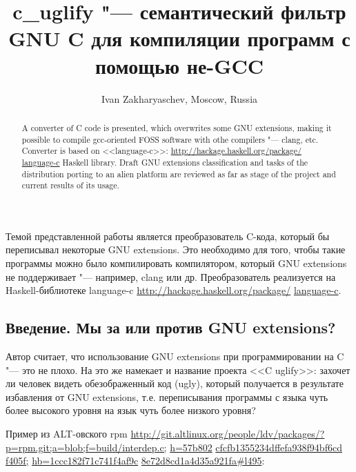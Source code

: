 \documentclass[10pt, a5paper]{article}
\begin{document}
\title{c\_uglify "--- семантический фильтр GNU C для компиляции программ с помощью не-GCC}
\author{Ivan Zakharyaschev, Moscow, Russia}
\maketitle
\begin{abstract}
A converter of C code is presented, which overwrites some GNU extensions, making it possible to compile gcc-oriented FOSS software with othe compilers "--- clang, etc. Converter is based on <<language-c>>: \url{http://hackage.haskell.org/package/} \linebreak \url{language-c} Haskell library. Draft GNU extensions classification and tasks of the  distribution porting to an alien platform are reviewed as far as stage of the project and current results of its usage.
\end{abstract}
Темой представленной работы является преобразователь C-кода, который бы переписывал некоторые GNU extensions. Это необходимо для того, чтобы такие программы можно было компилировать компилятором, который GNU extensions не поддерживает "--- например, clang или др. Преобразователь реализуется на Haskell-библиотеке language-c \url{http://hackage.haskell.org/package/} \linebreak \url{language-c}.

\subsection*{Введение. Мы за или против GNU extensions?}

Автор считает, что использование GNU extensions при программировании на C "--- это не плохо. На это же намекает и название проекта <<C uglify>>: захочет ли человек видеть обезображенный код (ugly), который получается в результате избавления от GNU \linebreak extensions, т.е. переписывания программы с языка чуть более высокого уровня на язык чуть более низкого уровня?


Пример из ALT-овского rpm \url{http://git.altlinux.org/people/ldv/packages/?p=rpm.git;a=blob;f=build/interdep.c;} \url{h=57b802} \url{cfcfb1355234dffefa938f94bf6cd} \url{f405f;} \url{hb=1ccc182f71c741f4af9c} \url{8e72d8cd1a4d35a921fa#l495}:

\lstset{ %
language=C,                 %
basicstyle=\small\sffamily, %
breaklines=true,           %
breakatwhitespace=false, %
}
\end{document}
